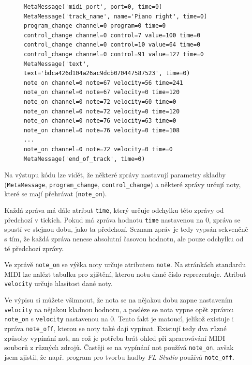 \begin{figure}[!ht]
    \begin{verbatim}
MetaMessage('midi_port', port=0, time=0)
MetaMessage('track_name', name='Piano right', time=0)
program_change channel=0 program=0 time=0
control_change channel=0 control=7 value=100 time=0
control_change channel=0 control=10 value=64 time=0
control_change channel=0 control=91 value=127 time=0
MetaMessage('text', text='bdca426d104a26ac9dcb070447587523', time=0)
note_on channel=0 note=67 velocity=56 time=241
note_on channel=0 note=67 velocity=0 time=120
note_on channel=0 note=72 velocity=60 time=0
note_on channel=0 note=72 velocity=0 time=120
note_on channel=0 note=76 velocity=63 time=0
note_on channel=0 note=76 velocity=0 time=108
...
note_on channel=0 note=72 velocity=0 time=0
MetaMessage('end_of_track', time=0)
    \end{verbatim}
\end{figure}
\pagebreak
Na výstupu kódu lze vidět, že některé zprávy nastavují parametry skladby (\lstinline{MetaMessage}, \lstinline{program_change}, \lstinline{control_change}) a některé zprávy určují noty, které se mají přehrávat (\lstinline{note_on}).

Každá zpráva má dále atribut \lstinline{time}, který určuje odchylku této zprávy od předchozí v tickích. Pokud má zpráva hodnotu \lstinline{time} nastavenou na 0, zpráva se spustí ve stejnou dobu, jako ta předchozí. Seznam zpráv je tedy vypsán sekvenčně s tím, že každá zpráva nenese absolutní časovou hodnotu, ale pouze odchylku od té předchozí zprávy.

Ve zprávě \lstinline{note_on} se výška noty určuje atributem \lstinline{note}. Na stránkách standardu MIDI \cite{midi-standard} lze nalézt tabulku pro zjištění, kterou notu dané číslo reprezentuje. Atribut \lstinline{velocity} určuje hlasitost dané noty.

Ve výpisu si můžete všimnout, že nota se na nějakou dobu zapne nastavením \lstinline{velocity} na nějakou kladnou hodnotu, a posléze se nota vypne opět zprávou \lstinline{note_on} s \lstinline{velocity} nastavenou na 0. Tento fakt je matoucí, jelikož existuje i zpráva \lstinline{note_off}, kterou se noty také dají vypínat. Existují tedy dva různé způsoby vypínání not, na což je potřeba brát ohled při zpracovávání MIDI souborů z různých zdrojů. Častěji se na vypínání not používá \lstinline{note_on}, avšak jsem zjistil, že např. program pro tvorbu hudby \textit{FL Studio} používá \lstinline{note_off}.

